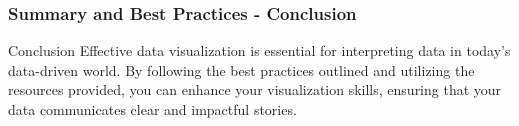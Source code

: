 \documentclass[aspectratio=169]{beamer}
\begin{document}
\begin{frame}[fragile]
    \frametitle{Summary and Best Practices - Conclusion}
    \begin{block}{Conclusion}
        Effective data visualization is essential for interpreting data in today's data-driven world. By following the best practices outlined and utilizing the resources provided, you can enhance your visualization skills, ensuring that your data communicates clear and impactful stories.
    \end{block}
\end{frame}
\end{document}
